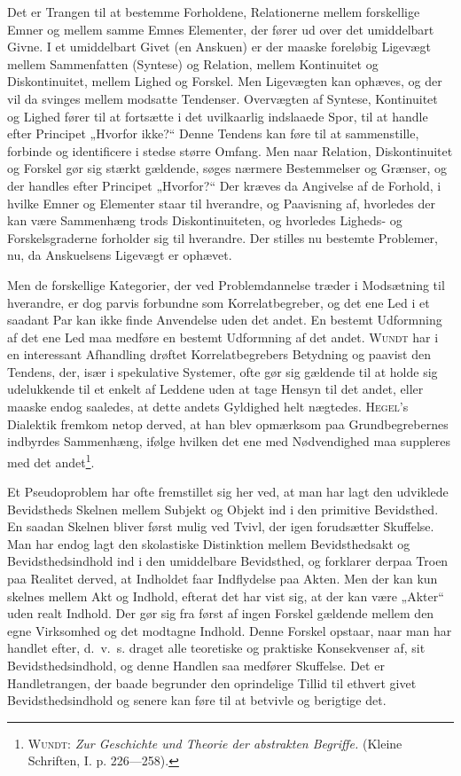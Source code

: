 \documentclass[12pt]{article}
\newcommand{\opage}[1]{\marginnote{\footnotesize\textit{[#1]}}}
\begin{document}
Det er Trangen til at bestemme Forholdene, Relationerne mellem forskellige
Emner og mellem samme Emnes Elementer, der fører ud over det umiddelbart
Givne. I et umiddelbart Givet (en Anskuen) er der maaske foreløbig Ligevægt
mellem Sammenfatten (Syntese) og Relation, mellem Kontinuitet og Diskontinuitet,
mellem Lighed og Forskel. Men Ligevægten kan ophæves, og der vil da svinges
\setcounter{footnote}{0}%
\opage{30}mellem modsatte Tendenser. Overvægten af Syntese, Kontinuitet og Lighed fører
til at fortsætte i det uvilkaarlig indslaaede Spor, til at handle efter Principet
„Hvorfor ikke?“ Denne Tendens kan føre til at sammenstille, forbinde og
identificere i stedse større Omfang. Men naar Relation, Diskontinuitet og Forskel gør
sig stærkt gældende, søges nærmere Bestemmelser og Grænser, og der handles efter
Principet „Hvorfor?“ Der kræves da Angivelse af de Forhold, i hvilke Emner og
Elementer staar til hverandre, og Paavisning af, hvorledes der kan være
Sammenhæng trods Diskontinuiteten, og hvorledes Ligheds- og Forskelsgraderne forholder
sig til hverandre. Der stilles nu bestemte Problemer, nu, da Anskuelsens Ligevægt
er ophævet.

Men de forskellige Kategorier, der ved Problemdannelse træder i Modsætning
til hverandre, er dog parvis forbundne som Korrelatbegreber, og det ene Led i et
saadant Par kan ikke finde Anvendelse uden det andet. En bestemt Udformning
af det ene Led maa medføre en bestemt Udformning af det andet. \textsc{Wundt} har i
en interessant Afhandling drøftet Korrelatbegrebers Betydning og paavist den
Tendens, der, især i spekulative Systemer, ofte gør sig gældende til at holde sig
udelukkende til et enkelt af Leddene uden at tage Hensyn til det andet, eller maaske
endog saaledes, at dette andets Gyldighed helt nægtedes. \textsc{Hegel}'s Dialektik fremkom
netop derved, at han blev opmærksom paa Grundbegrebernes indbyrdes Sammenhæng,
ifølge hvilken det ene med Nødvendighed maa suppleres med det
andet\footnote{\textsc{Wundt}: \textit{Zur Geschichte und Theorie der abstrakten
Begriffe.} (Kleine Schriften, I. p. 226---258).}.

Et Pseudoproblem har ofte fremstillet sig her ved, at man har lagt den udviklede
Bevidstheds Skelnen mellem Subjekt og Objekt ind i den primitive Bevidsthed. En
saadan Skelnen bliver først mulig ved Tvivl, der igen forudsætter Skuffelse. Man
har endog lagt den skolastiske Distinktion mellem Bevidsthedsakt og
Bevidsthedsindhold ind i den umiddelbare Bevidsthed, og forklarer derpaa Troen
paa Realitet derved, at Indholdet faar Indflydelse paa Akten. Men der kan kun
skelnes mellem Akt og Indhold, efterat det har vist sig, at der kan være „Akter“
uden realt Indhold. Der gør sig fra først af ingen Forskel gældende mellem den
egne Virksomhed og det modtagne Indhold. Denne Forskel opstaar, naar man har
handlet efter, d.~v.~s. draget alle teoretiske og praktiske Konsekvenser af, sit
Bevidsthedsindhold, og denne Handlen saa medfører Skuffelse. Det er Handletrangen,
der baade begrunder den oprindelige Tillid til ethvert givet Bevidsthedsindhold og
senere kan føre til at betvivle og berigtige det.
\end{document}
